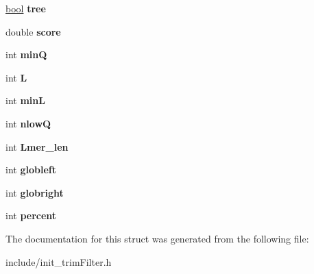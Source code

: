 \begin{DoxyCompactItemize}
\item 
\hypertarget{struct__iparam__trimFilter_ac36acafc4290934f81444425f780deda}{\hyperlink{defines_8h_abb452686968e48b67397da5f97445f5b}{bool} {\bfseries tree}}\label{struct__iparam__trimFilter_ac36acafc4290934f81444425f780deda}

\item 
\hypertarget{struct__iparam__trimFilter_a193ef2030f6eb8db0b75afbbd152d6a1}{double {\bfseries score}}\label{struct__iparam__trimFilter_a193ef2030f6eb8db0b75afbbd152d6a1}

\item 
\hypertarget{struct__iparam__trimFilter_a1e2b69f148d9299815af6ab7f575ad1a}{int {\bfseries min\+Q}}\label{struct__iparam__trimFilter_a1e2b69f148d9299815af6ab7f575ad1a}

\item 
\hypertarget{struct__iparam__trimFilter_a72fcc236d4136d2405a04f155b515894}{int {\bfseries L}}\label{struct__iparam__trimFilter_a72fcc236d4136d2405a04f155b515894}

\item 
\hypertarget{struct__iparam__trimFilter_ac2b43664ca0c95a8572f97254893d675}{int {\bfseries min\+L}}\label{struct__iparam__trimFilter_ac2b43664ca0c95a8572f97254893d675}

\item 
\hypertarget{struct__iparam__trimFilter_aaeab85398303eada76cb6f32841fa094}{int {\bfseries nlow\+Q}}\label{struct__iparam__trimFilter_aaeab85398303eada76cb6f32841fa094}

\item 
\hypertarget{struct__iparam__trimFilter_a8d64cf4832f3c403bd7c505d5a3fee75}{int {\bfseries Lmer\+\_\+len}}\label{struct__iparam__trimFilter_a8d64cf4832f3c403bd7c505d5a3fee75}

\item 
\hypertarget{struct__iparam__trimFilter_a2e626c5776d4423d20d5ec7606fe9b81}{int {\bfseries globleft}}\label{struct__iparam__trimFilter_a2e626c5776d4423d20d5ec7606fe9b81}

\item 
\hypertarget{struct__iparam__trimFilter_ad5fb4ca1786b14cd63a8467187474f51}{int {\bfseries globright}}\label{struct__iparam__trimFilter_ad5fb4ca1786b14cd63a8467187474f51}

\item 
\hypertarget{struct__iparam__trimFilter_a8ed026b1de4fccc7288258c3a8faa395}{int {\bfseries percent}}\label{struct__iparam__trimFilter_a8ed026b1de4fccc7288258c3a8faa395}

\end{DoxyCompactItemize}


The documentation for this struct was generated from the following file\+:\begin{DoxyCompactItemize}
\item 
include/init\+\_\+trim\+Filter.\+h\end{DoxyCompactItemize}
